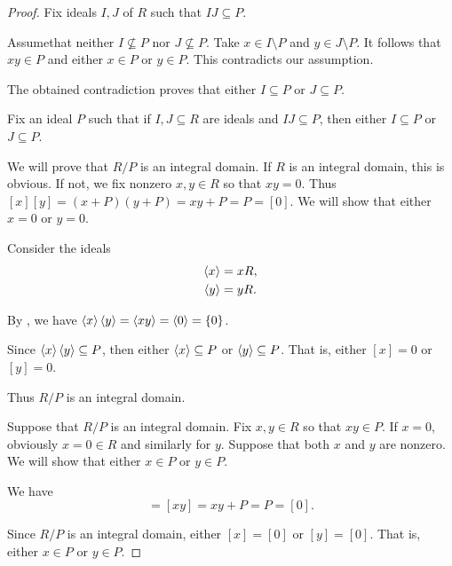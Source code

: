 \begin{proof}
   Fix ideals \( I, J \) of \( R \) such that \( IJ \subseteq P \).

  Assume\LEM that neither \( I \not\subseteq P \) nor \( J \not\subseteq P \). Take \( x \in I \setminus P \) and \( y \in J \setminus P \). It follows that \( xy \in P \) and either \( x \in P \) or \( y \in P \). This contradicts our assumption.

  The obtained contradiction proves that either \( I \subseteq P \) or \( J \subseteq P \).

   Fix an ideal \( P \) such that if \( I, J \subseteq R \) are ideals and \( IJ \subseteq P \), then either \( I \subseteq P \) or \( J \subseteq P \).

  We will prove that \( R / P \) is an integral domain. If \( R \) is an integral domain, this is obvious. If not, we fix nonzero \( x, y \in R \) so that \( xy = 0 \). Thus \( [x][y] = (x + P)(y + P) = xy + P = P = [0] \). We will show that either \( x = 0 \) or \( y = 0 \).

  Consider the ideals
  \begin{align*}
    \left\langle x \right\rangle &= xR, \\
    \left\langle y \right\rangle &= yR.
  \end{align*}

  By , we have \( \left\langle x \right\rangle \left\langle y \right\rangle = \left\langle xy \right\rangle = \left\langle 0 \right\rangle = \{ 0 \} \).

  Since \( \left\langle x \right\rangle \left\langle y \right\rangle \subseteq P \), then either \( \left\langle x \right\rangle \subseteq P \) or \( \left\langle y \right\rangle \subseteq P \). That is, either \( [x] = 0 \) or \( [y] = 0 \).

  Thus \( R / P \) is an integral domain.

   Suppose that \( R / P \) is an integral domain. Fix \( x, y \in R \) so that \( xy \in P \). If \( x = 0 \), obviously \( x = 0 \in R \) and similarly for \( y \). Suppose that both \( x \) and \( y \) are nonzero. We will show that either \( x \in P \) or \( y \in P \).

  We have
  \begin{equation*}
    [x][y] = [xy] = xy + P = P = [0].
  \end{equation*}

  Since \( R / P \) is an integral domain, either \( [x] = [0] \) or \( [y] = [0] \). That is, either \( x \in P \) or \( y \in P \).
\end{proof}


